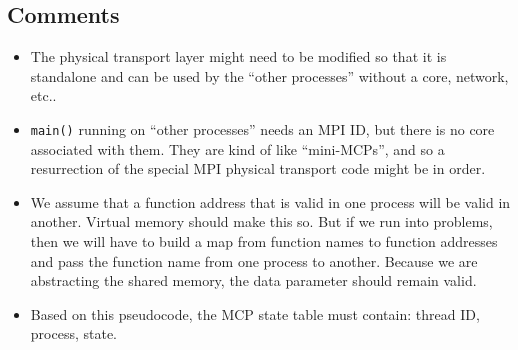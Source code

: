 \documentclass[10pt,twocolumn]{article}
\begin{document}
\subsection{Comments}
\label{sec:comments}

\begin{itemize}
\item The physical transport layer might need to be modified so that
  it is standalone and can be used by the ``other processes'' without
  a core, network, etc..
\item \texttt{main()} running on ``other processes'' needs an MPI ID,
  but there is no core associated with them. They are kind of like
  ``mini-MCPs'', and so a resurrection of the special MPI physical
  transport code might be in order.
\item We assume that a function address that is valid in one process
  will be valid in another. Virtual memory should make this so. But if
  we run into problems, then we will have to build a map from function
  names to function addresses and pass the function name from one
  process to another. Because we are abstracting the shared memory,
  the data parameter should remain valid.
\item Based on this pseudocode, the MCP state table must contain:
  thread ID, process, state.
\end{itemize}
\end{document}
